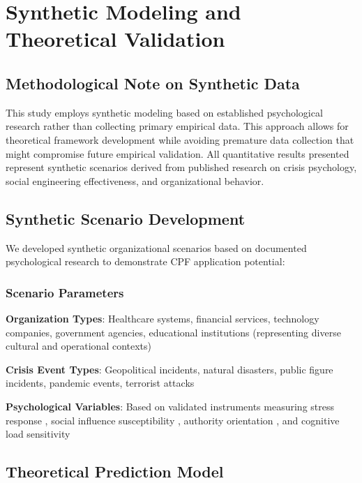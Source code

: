 \documentclass[11pt,a4paper]{article}
\begin{document}
\section{Synthetic Modeling and Theoretical Validation}

\subsection{Methodological Note on Synthetic Data}

This study employs synthetic modeling based on established psychological research rather than collecting primary empirical data. This approach allows for theoretical framework development while avoiding premature data collection that might compromise future empirical validation. All quantitative results presented represent synthetic scenarios derived from published research on crisis psychology, social engineering effectiveness, and organizational behavior.

\subsection{Synthetic Scenario Development}

We developed synthetic organizational scenarios based on documented psychological research to demonstrate CPF application potential:

\subsubsection{Scenario Parameters}

\textbf{Organization Types}: Healthcare systems, financial services, technology companies, government agencies, educational institutions (representing diverse cultural and operational contexts)

\textbf{Crisis Event Types}: Geopolitical incidents, natural disasters, public figure incidents, pandemic events, terrorist attacks

\textbf{Psychological Variables}: Based on validated instruments measuring stress response \cite{cohen1983}, social influence susceptibility \cite{cialdini2021}, authority orientation \cite{altemeyer1981}, and cognitive load sensitivity \cite{paas2003}

\subsection{Theoretical Prediction Model}
\end{document}
